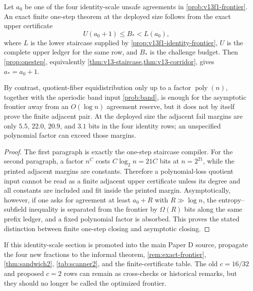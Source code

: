 \begin{proposition}\label{prop:v13f1-closing}
Let $a_0$ be one of the four identity-scale unsafe agreements in \cref{prob:v13f1-frontier}.  An exact finite one-step theorem at the deployed size follows from the exact upper certificate
\[
        U(a_0+1)\le B_*<L(a_0),
\]
where $L$ is the lower staircase supplied by \cref{prop:v13f1-identity-frontier}, $U$ is the complete upper ledger for the same row, and $B_*$ is the challenge budget.  Then \cref{prop:onestep}, equivalently \cref{thm:v13-staircase,thm:v13-corridor}, gives $a_*=a_0+1$.

By contrast, quotient-fiber equidistribution only up to a factor $\operatorname{poly}(n)$, together with the aperiodic band input \cref{prob:band}, is enough for the asymptotic frontier away from an $O(\log n)$ agreement reserve, but it does not by itself prove the finite adjacent pair.  At the deployed size the adjacent fail margins are only $5.5$, $22.0$, $20.9$, and $3.1$ bits in the four identity rows; an unspecified polynomial factor can exceed those margins.
\end{proposition}

\begin{proof}
The first paragraph is exactly the one-step staircase compiler.  For the second paragraph, a factor $n^C$ costs $C\log_2 n=21C$ bits at $n=2^{21}$, while the printed adjacent margins are constants.  Therefore a polynomial-loss quotient input cannot be read as a finite adjacent upper certificate unless its degree and all constants are included and fit inside the printed margin.  Asymptotically, however, if one asks for agreement at least $a_0+R$ with $R\gg\log n$, the entropy--subfield inequality is separated from the frontier by $\Omega(R)$ bits along the same prefix ledger, and a fixed polynomial factor is absorbed.  This proves the stated distinction between finite one-step closing and asymptotic closing.
\end{proof}

\begin{remark}\label{rem:v13f1-propagation}
If this identity-scale section is promoted into the main Paper D source, propagate the four new fractions to the informal theorem, \cref{rem:exact-frontier}, \cref{thm:sandwich2}, \cref{tab:scanner2}, and the finite-certificate table.  The old $c=16/32$ and proposed $c=2$ rows can remain as cross-checks or historical remarks, but they should no longer be called the optimized frontier.
\end{remark}

